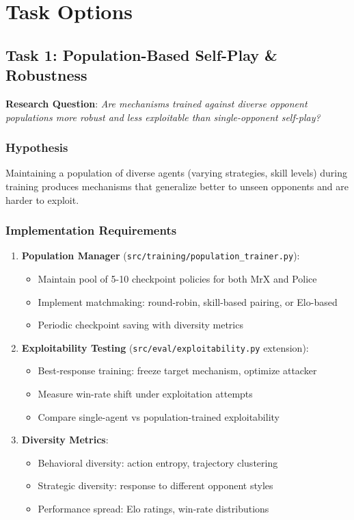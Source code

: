 \documentclass[11pt,a4paper]{scrartcl}
\newcommand{\codepath}[1]{\colorbox{codehighlight}{\texttt{#1}}}
\begin{document}
\section*{Task Options}

\subsection*{Task 1: Population-Based Self-Play \& Robustness}
\textbf{Research Question}: \textit{Are mechanisms trained against diverse opponent populations more robust and less exploitable than single-opponent self-play?}

\subsubsection*{Hypothesis}
Maintaining a population of diverse agents (varying strategies, skill levels) during training produces mechanisms that generalize better to unseen opponents and are harder to exploit.

\subsubsection*{Implementation Requirements}
\begin{enumerate}[leftmargin=1.4em]
    \item \textbf{Population Manager} (\codepath{src/training/population\_trainer.py}):
    \begin{itemize}
        \item Maintain pool of 5-10 checkpoint policies for both MrX and Police
        \item Implement matchmaking: round-robin, skill-based pairing, or Elo-based
        \item Periodic checkpoint saving with diversity metrics
    \end{itemize}
    
    \item \textbf{Exploitability Testing} (\codepath{src/eval/exploitability.py} extension):
    \begin{itemize}
        \item Best-response training: freeze target mechanism, optimize attacker
        \item Measure win-rate shift under exploitation attempts
        \item Compare single-agent vs population-trained exploitability
    \end{itemize}
    
    \item \textbf{Diversity Metrics}:
    \begin{itemize}
        \item Behavioral diversity: action entropy, trajectory clustering
        \item Strategic diversity: response to different opponent styles
        \item Performance spread: Elo ratings, win-rate distributions
    \end{itemize}
\end{enumerate}
\end{document}
